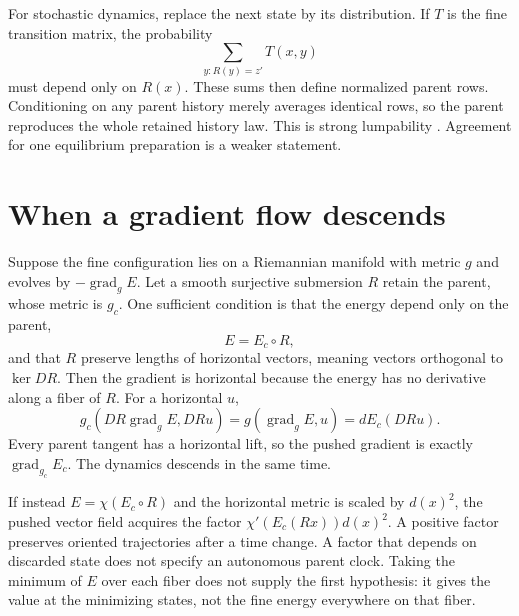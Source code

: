For stochastic dynamics, replace the next state by its distribution. If $T$
is the fine transition matrix, the probability
\begin{equation}
 \sum_{y:R(y)=z'}T(x,y)
\end{equation}
must depend only on $R(x)$. These sums then define normalized parent rows.
Conditioning on any parent history merely averages identical rows, so the
parent reproduces the whole retained history law. This is strong lumpability
\citep{KemenySnell1976}. Agreement for one equilibrium preparation is a
weaker statement.

\section{When a gradient flow descends}

Suppose the fine configuration lies on a Riemannian manifold with metric $g$ and evolves by $-\operatorname{grad}_g E$. Let a smooth surjective submersion $R$ retain the parent, whose metric is $g_c$. One sufficient condition is that the energy depend only on the parent,
\begin{equation}
E=E_c\circ R,
\end{equation}
and that $R$ preserve lengths of horizontal vectors, meaning vectors orthogonal to $\ker DR$. Then the gradient is horizontal because the energy has no derivative along a fiber of $R$. For a horizontal $u$,
\begin{equation}
g_c(DR\operatorname{grad}_gE,DR u)
=g(\operatorname{grad}_gE,u)
=dE_c(DR u).
\end{equation}
Every parent tangent has a horizontal lift, so the pushed gradient is exactly $\operatorname{grad}_{g_c}E_c$. The dynamics descends in the same time.

If instead $E=\chi(E_c\circ R)$ and the horizontal metric is scaled by $d(x)^2$, the pushed vector field acquires the factor $\chi'(E_c(Rx))d(x)^2$. A positive factor preserves oriented trajectories after a time change. A factor that depends on discarded state does not specify an autonomous parent clock. Taking the minimum of $E$ over each fiber does not supply the first hypothesis: it gives the value at the minimizing states, not the fine energy everywhere on that fiber.

